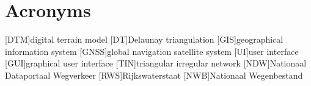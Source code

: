 \chapter*{Acronyms}

\begin{acronym}[UML]
  [DTM]{digital terrain model}
  [DT]{Delaunay triangulation}
  [GIS]{geographical information system}
  [GNSS]{global navigation satellite system}
  [UI]{user interface}
  [GUI]{graphical user interface}
  [TIN]{triangular irregular network}
  [NDW]{Nationaal Dataportaal Wegverkeer}
  [RWS]{Rijkswaterstaat}
  [NWB]{Nationaal Wegenbestand}
\end{acronym}